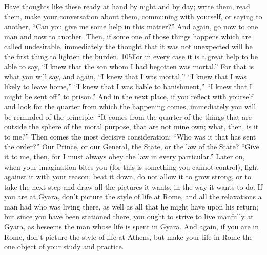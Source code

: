 Have thoughts like these ready at hand by night and by day; write them, read them, make your conversation about them, communing with yourself, or saying to another, ``Can you give me some help in this matter?'' And again, go now to one man and now to another. Then, if some one of those things happens which are called undesirable, immediately the thought that it was not unexpected will be the first thing to lighten the burden. 105For in every case it is a great help to be able to say, ``I knew that the son whom I had begotten was mortal.'' For that is what you will say, and again, ``I knew that I was mortal,'' ``I knew that I was likely to leave home,'' ``I knew that I was liable to banishment,'' ``I knew that I might be sent off'' to prison.'' And in the next place, if you reflect with yourself and look for the quarter from which the happening comes, immediately you will be reminded of the principle: ``It comes from the quarter of the things that are outside the sphere of the moral purpose, that are not mine own; what, then, is it to me?'' Then comes the most decisive consideration: ``Who was it that has sent the order?'' Our Prince, or our General, the State, or the law of the State? ``Give it to me, then, for I must always obey the law in every particular.'' Later on, when your imagination bites you (for this is something you cannot control), fight against it with your reason, beat it down, do not allow it to grow strong, or to take the next step and draw all the pictures it wants, in the way it wants to do. If you are at Gyara, don't picture the style of life at Rome, and all the relaxations a man had who was living there, as well as all that he might have upon his return; but since you have been stationed there, you ought to strive to live manfully at Gyara, as beseems the man whose life is spent in Gyara. And again, if you are in Rome, don't picture the style of life at Athens, but make your life in Rome the one object of your study and practice.

